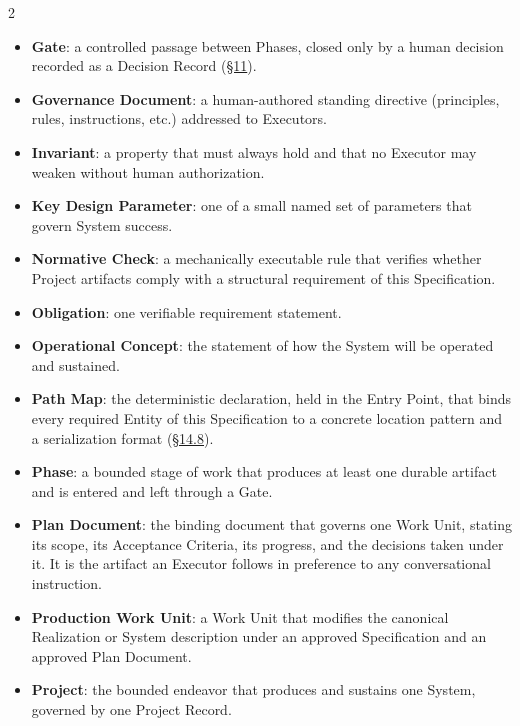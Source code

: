 \begin{multicols}{2}
\begin{itemize}
\item \textbf{Gate}: a controlled passage between Phases, closed only by a human decision recorded as a Decision Record (\hyperlink{nss-11}{\S11}).

\item \textbf{Governance Document}: a human-authored standing directive (principles, rules, instructions, etc.) addressed to Executors.

\item \textbf{Invariant}: a property that must always hold and that no Executor may weaken without human authorization.

\item \textbf{Key Design Parameter}: one of a small named set of parameters that govern System success.

\item \textbf{Normative Check}: a mechanically executable rule that verifies whether Project artifacts comply with a structural requirement of this Specification.

\item \textbf{Obligation}: one verifiable requirement statement.

\item \textbf{Operational Concept}: the statement of how the System will be operated and sustained.

\item \textbf{Path Map}: the deterministic declaration, held in the Entry Point, that binds every required Entity of this Specification to a concrete location pattern and a serialization format (\hyperlink{nss-14.8}{\S14.8}).

\item \textbf{Phase}: a bounded stage of work that produces at least one durable artifact and is entered and left through a Gate.

\item \textbf{Plan Document}: the binding document that governs one Work Unit, stating its scope, its Acceptance Criteria, its progress, and the decisions taken under it. It is the artifact an Executor follows in preference to any conversational instruction.

\item \textbf{Production Work Unit}: a Work Unit that modifies the canonical Realization or System description under an approved Specification and an approved Plan Document.

\item \textbf{Project}: the bounded endeavor that produces and sustains one System, governed by one Project Record.


\end{itemize}
\end{multicols}

